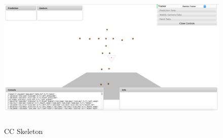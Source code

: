 \begin{figure}
	[h] \centering 
	\includegraphics[height=7cm]{figures/content/cc-skeleton.png} 
	\caption{CC Skeleton} 
	\label{fg:cc:skeleton} 
\end{figure}